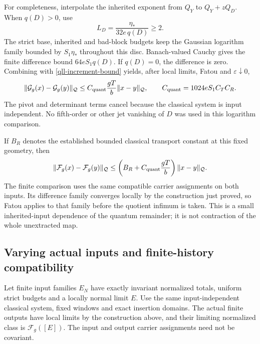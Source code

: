 For completeness, interpolate the inherited exponent from
\(Q_Y\) to \(Q_Y+zQ_D\). When \(q(D)>0\), use
\begin{equation}
 L_D=\frac{\eta_*}{32e\,q(D)}\ge2.
 \label{qll-interpolation-radius}
\end{equation}
The strict base, inherited and bad-block budgets keep the
Gaussian logarithm family bounded by \(S_1\eta_*\) throughout
this disc. Banach-valued Cauchy gives the finite difference
bound \(64eS_1q(D)\). If \(q(D)=0\), the difference is zero.
Combining with \eqref{qll-increment-bound} yields, after
local limits, Fatou and \(\varepsilon\downarrow0\),
\begin{equation}
 \|\mathcal G_g(x)-\mathcal G_g(y)\|_{\mathcal Q}
 \le C_{\rm quant}\frac{gT}{b}\|x-y\|_{\mathcal Q},
 \qquad C_{\rm quant}=1024eS_1C_TC_R .
 \label{qll-quantum-Lipschitz}
\end{equation}
The pivot and determinant terms cancel because the classical
system is input independent. No fifth-order or other jet
vanishing of \(D\) was used in this logarithm comparison.

If \(B_R\) denotes the established bounded classical transport
constant at this fixed geometry, then
\begin{equation}
 \|\mathcal F_g(x)-\mathcal F_g(y)\|_{\mathcal Q}
 \le\left(B_R+C_{\rm quant}\frac{gT}{b}\right)
                                  \|x-y\|_{\mathcal Q}.
 \label{qll-full-Lipschitz}
\end{equation}
The finite comparison uses the same compatible carrier
assignments on both inputs. Its difference family converges
locally by the construction just proved, so Fatou applies
to that family before the quotient infimum is taken.
This is a small inherited-input dependence of the quantum
remainder; it is not contraction of the whole unextracted map.

\subsection{Varying actual inputs and finite-history compatibility}
\label{qll-varying-section}

\begin{theorem}
\label{qll-varying-theorem}
Let finite input families \(E_N\) have exactly invariant
normalized totals, uniform strict budgets and a locally normal
limit \(E\). Use the same input-independent classical system,
fixed windows and exact insertion domains. The actual finite
outputs have local limits by the construction above, and their
limiting normalized class is \(\mathcal F_g([E])\).
The input and output carrier assignments need not be covariant.
\end{theorem}

